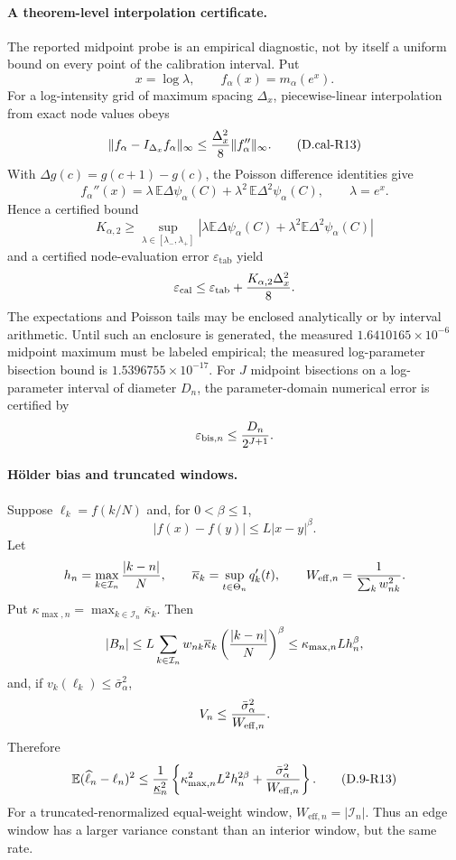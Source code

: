 \paragraph{A theorem-level interpolation certificate.}
The reported midpoint probe is an empirical diagnostic, not by itself
a uniform bound on every point of the calibration interval.  Put
\[
 x=\log\lambda,\qquad f_\alpha(x)=m_\alpha(e^x).
\]
For a log-intensity grid of maximum spacing $\Delta_x$, piecewise-linear
interpolation from exact node values obeys
\begin{equation}
 \|f_\alpha-I_{\Delta_x}f_\alpha\|_\infty
 \le {\Delta_x^2\over8}\|f_\alpha''\|_\infty. \tag{D.cal-R13}
\end{equation}
With $\Delta g(c)=g(c+1)-g(c)$, the Poisson difference identities give
\[
 f_\alpha''(x)
 =\lambda\,\mathbb E\Delta\psi_\alpha(C)
 +\lambda^2\,\mathbb E\Delta^2\psi_\alpha(C),
 \qquad \lambda=e^x.
\]
Hence a certified bound
\[
 K_{\alpha,2}\ge
 \sup_{\lambda\in[\lambda_-,\lambda_+]}
 \left|\lambda\mathbb E\Delta\psi_\alpha(C)
 +\lambda^2\mathbb E\Delta^2\psi_\alpha(C)\right|
\]
and a certified node-evaluation error $\varepsilon_{\mathrm{tab}}$
yield
\[
 \varepsilon_{\mathrm{cal}}
 \le\varepsilon_{\mathrm{tab}}
 +{K_{\alpha,2}\Delta_x^2\over8}.
\]
The expectations and Poisson tails may be enclosed analytically or by
interval arithmetic.  Until such an enclosure is generated, the measured
$1.6410165\times10^{-6}$ midpoint maximum must be labeled empirical; the
measured log-parameter bisection bound is
$1.5396755\times10^{-17}$.
For $J$ midpoint bisections on a log-parameter interval of diameter
$D_n$, the parameter-domain numerical error is certified by
\[
 \varepsilon_{\mathrm{bis},n}\le {D_n\over2^{J+1}}.
\]

\paragraph{H\"older bias and truncated windows.}
Suppose $\ell_k=f(k/N)$ and, for $0<\beta\le1$,
\[
 |f(x)-f(y)|\le L|x-y|^\beta.
\]
Let
\[
 h_n=\max_{k\in\mathcal I_n}{|k-n|\over N},\qquad
 \overline\kappa_k=\sup_{t\in\Theta_n}q_k'(t),\qquad
 W_{\mathrm{eff},n}={1\over\sum_kw_{nk}^2}.
\]
Put $\kappa_{\max,n}=\max_{k\in\mathcal I_n}\overline\kappa_k$.
Then
\[
 |B_n|
 \le L\sum_{k\in\mathcal I_n}w_{nk}\overline\kappa_k
       \left({|k-n|\over N}\right)^\beta
 \le\kappa_{\max,n}Lh_n^\beta,
\]
and, if $v_k(\ell_k)\le\bar\sigma_\alpha^2$,
\[
 V_n\le{\bar\sigma_\alpha^2\over W_{\mathrm{eff},n}}.
\]
Therefore
\begin{equation}
 \mathbb E(\widehat\ell_n-\ell_n)^2
 \le {1\over\underline\kappa_n^2}
 \left\{\kappa_{\max,n}^2L^2h_n^{2\beta}
       +{\bar\sigma_\alpha^2\over W_{\mathrm{eff},n}}\right\}.
 \tag{D.9-R13}
\end{equation}
For a truncated-renormalized equal-weight window,
$W_{\mathrm{eff},n}=|\mathcal I_n|$.  Thus an edge window has a larger
variance constant than an interior window, but the same rate.

